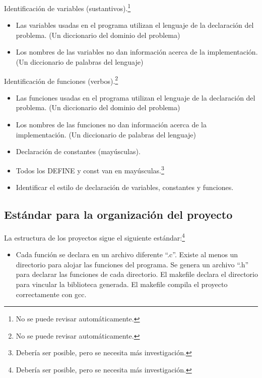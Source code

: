 \documentclass[
  12,
]{scrartcl}
\providecommand{\tightlist}{%
  \setlength{\itemsep}{0pt}\setlength{\parskip}{0pt}}
\begin{document}
Identificación de variables (sustantivos).\footnote{No se puede revisar
  automáticamente.}

\begin{itemize}
\tightlist
\item
  Las variables usadas en el programa utilizan el lenguaje de la
  declaración del problema. (Un diccionario del dominio del problema)
\item
  Los nombres de las variables no dan información acerca de la
  implementación. (Un diccionario de palabras del lenguaje)
\end{itemize}

Identificación de funciones (verbos).\footnote{No se puede revisar
  automáticamente.}

\begin{itemize}
\item
  Las funciones usadas en el programa utilizan el lenguaje de la
  declaración del problema. (Un diccionario del dominio del problema)
\item
  Los nombres de las funciones no dan información acerca de la
  implementación. (Un diccionario de palabras del lenguaje)
\item
  Declaración de constantes (mayúsculas).
\item
  Todos los DEFINE y const van en mayúsculas.\footnote{Debería ser
    posible, pero se necesita más investigación.}
\item
  Identificar el estilo de declaración de variables, constantes y
  funciones.
\end{itemize}

\hypertarget{estuxe1ndar-para-la-organizaciuxf3n-del-proyecto}{%
\subsection{Estándar para la organización del
proyecto}\label{estuxe1ndar-para-la-organizaciuxf3n-del-proyecto}}

La estructura de los proyectos sigue el siguiente estándar:\footnote{Debería
  ser posible, pero se necesita más investigación.}

\begin{itemize}
\tightlist
\item
  Cada función se declara en un archivo diferente ``.c''. Existe al
  menos un directorio para alojar las funciones del programa. Se genera
  un archivo ``.h'' para declarar las funciones de cada directorio. El
  makefile declara el directorio para vincular la biblioteca generada.
  El makefile compila el proyecto correctamente con gcc.
\end{itemize}
\end{document}
